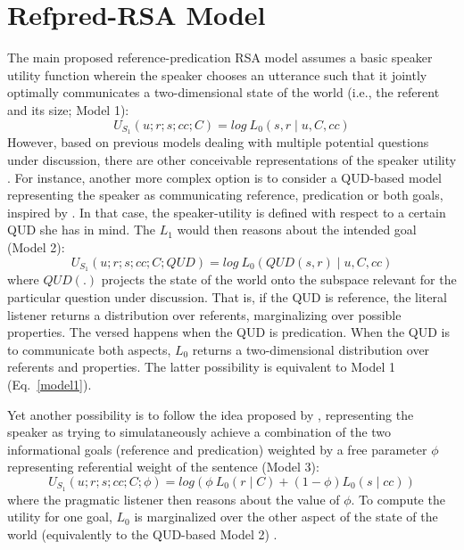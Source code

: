 \section{Refpred-RSA Model}
The main proposed reference-predication RSA model assumes a basic speaker utility function wherein the speaker chooses an utterance such that it jointly optimally communicates a two-dimensional state of the world (i.e., the referent and its size; Model 1):
\begin{equation*}
\label{model1}
U_{S_1} (u; r; s; cc; C) = log \: L_0 (s, r \mid u, C, cc) 
\end{equation*}
However, based on previous models dealing with multiple potential questions under discussion, there are other conceivable representations of the speaker utility \parencite[cf.][]{kao2014nonliteral, yoon2016talking}. For instance, another more complex option is to consider a QUD-based model representing the speaker as communicating reference, predication or both goals, inspired by \textcite{kao2014nonliteral}. In that case, the speaker-utility is defined with respect to a certain QUD she has in mind. The $L_1$ would then reasons about the intended goal (Model 2):
\begin{equation*}
U_{S_1} (u; r; s; cc; C; QUD) = log \: L_0(QUD(s, r) \mid u, C, cc)
\end{equation*} 
where $QUD(.)$ projects the state of the world onto the subspace relevant for the particular question under discussion. That is, if the QUD is reference, the literal listener returns a distribution over referents, marginalizing over possible properties. The versed happens when the QUD is predication. When the QUD is to communicate both aspects, $L_0$ returns a two-dimensional distribution over referents and properties. The latter possibility is equivalent to Model 1 (Eq.~\ref{model1}).  

Yet another possibility is to follow the idea proposed by \textcite{yoon2016talking}, representing the speaker as trying to simulataneously achieve a combination of the two informational goals (reference and predication) weighted by a free parameter $\phi$ representing referential weight of the sentence (Model 3):
\begin{equation*}
U_{S_1} (u; r; s; cc; C; \phi) = log(\phi \: L_0(r \mid C) + (1 - \phi) L_0(s \mid cc))
\end{equation*} 
where the pragmatic listener then reasons about the value of $\phi$. To compute the utility for one goal, $L_0$ is marginalized over the other aspect of the state of the world (equivalently to the QUD-based Model 2) .
